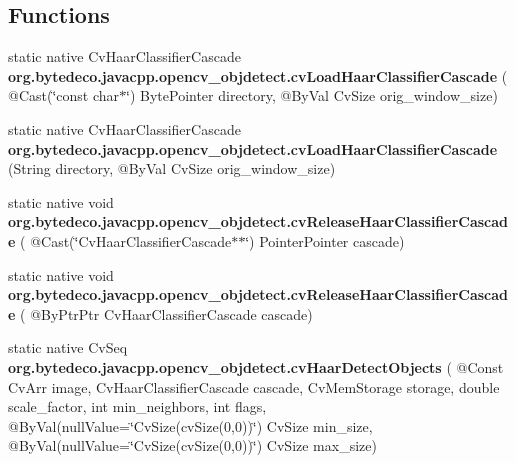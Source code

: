 \subsection*{Functions}
\begin{DoxyCompactItemize}
\item 
\mbox{\label{group__objdetect__c_ga64819768c63830b9a105f22ce78c41cc}} 
static native Cv\+Haar\+Classifier\+Cascade {\bfseries org.\+bytedeco.\+javacpp.\+opencv\+\_\+objdetect.\+cv\+Load\+Haar\+Classifier\+Cascade} ( @Cast(\char`\"{}const char$\ast$\char`\"{}) Byte\+Pointer directory, @By\+Val Cv\+Size orig\+\_\+window\+\_\+size)
\item 
\mbox{\label{group__objdetect__c_gae9a75b053261c839ec2b0d341e5755a7}} 
static native Cv\+Haar\+Classifier\+Cascade {\bfseries org.\+bytedeco.\+javacpp.\+opencv\+\_\+objdetect.\+cv\+Load\+Haar\+Classifier\+Cascade} (String directory, @By\+Val Cv\+Size orig\+\_\+window\+\_\+size)
\item 
\mbox{\label{group__objdetect__c_gad1ed7db6364d731f9745caff91c9848f}} 
static native void {\bfseries org.\+bytedeco.\+javacpp.\+opencv\+\_\+objdetect.\+cv\+Release\+Haar\+Classifier\+Cascade} ( @Cast(\char`\"{}Cv\+Haar\+Classifier\+Cascade$\ast$$\ast$\char`\"{}) Pointer\+Pointer cascade)
\item 
\mbox{\label{group__objdetect__c_ga99d479c954b266239e00892f0d7accf7}} 
static native void {\bfseries org.\+bytedeco.\+javacpp.\+opencv\+\_\+objdetect.\+cv\+Release\+Haar\+Classifier\+Cascade} ( @By\+Ptr\+Ptr Cv\+Haar\+Classifier\+Cascade cascade)
\item 
\mbox{\label{group__objdetect__c_gaf5ecaf5cf5901aa5f37f1f3c2652318d}} 
static native Cv\+Seq {\bfseries org.\+bytedeco.\+javacpp.\+opencv\+\_\+objdetect.\+cv\+Haar\+Detect\+Objects} ( @Const Cv\+Arr image, Cv\+Haar\+Classifier\+Cascade cascade, Cv\+Mem\+Storage storage, double scale\+\_\+factor, int min\+\_\+neighbors, int flags, @By\+Val(null\+Value=\char`\"{}Cv\+Size(cv\+Size(0,0))\char`\"{}) Cv\+Size min\+\_\+size, @By\+Val(null\+Value=\char`\"{}Cv\+Size(cv\+Size(0,0))\char`\"{}) Cv\+Size max\+\_\+size)
\item 
\mbox{\label{group__objdetect__c_gac859f3d24cac2e7d99415c5ebabae807}} 
$$
\end{DoxyCompactItemize}
